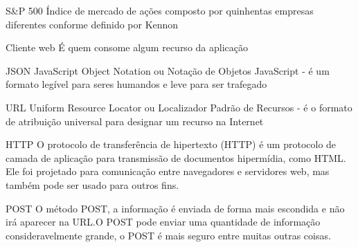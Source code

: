 \begin{siglas}
    \item[S\&P 500] Índice de mercado de ações composto por
                    quinhentas empresas diferentes conforme definido
                    por Kennon \cite{definicao-de-sp500}

    \item[Cliente web] É quem consome algum recurso da aplicação

    \item[JSON] JavaScript Object Notation ou Notação de Objetos JavaScript -
                é um formato legível para seres humandos e leve para ser trafegado \cite{define-json}

    \item[URL] Uniform Resource Locator ou Localizador Padrão de Recursos - é o formato de atribuição
               universal para designar um recurso na Internet \cite{define-url}
               
    \item[HTTP] O protocolo de transferência de hipertexto (HTTP) é um protocolo de camada de aplicação
               para transmissão de documentos hipermídia, como HTML. Ele foi projetado para comunicação
               entre navegadores e servidores web, mas também pode ser usado para outros fins.\cite{define-http}
               
    \item[POST] O método POST, a informação é enviada de forma mais escondida e não irá aparecer na URL.O POST
                pode enviar uma quantidade de informação consideravelmente grande, o POST é mais seguro entre 
                muitas outras coisas.\cite{define-post}
\end{siglas}
